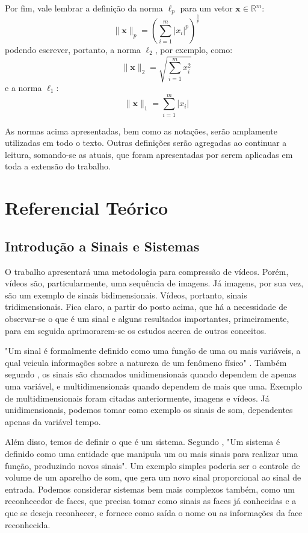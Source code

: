 \documentclass[cic,tc]{iiufrgs}
\renewcommand{\vec}[1]{\bm{#1}}
\begin{document}
Por fim, vale lembrar a definição da norma $\ell_p$ para um vetor $\vec{x} \in \mathbb{R}^m$:
\begin{equation*}
    \lVert \vec{x} \rVert_p = 
    \left( \sum_{i=1}^m {|x_i|^p} \right)^{\frac{1}{p}}
\end{equation*}
podendo escrever, portanto, a norma $\ell_2$, por exemplo, como:
\begin{equation*}
    \lVert \vec{x} \rVert_2 = 
    \sqrt{\sum_{i=1}^m {x_i^2}}
\end{equation*}
e a norma $\ell_1$:
\begin{equation*}
    \lVert \vec{x} \rVert_1 = 
    \sum_{i=1}^m {|x_i|}
\end{equation*}

As normas acima apresentadas, bem como as notações, serão amplamente utilizadas
em todo o texto. 
Outras definições serão agregadas ao continuar a leitura, somando-se as atuais, 
que foram apresentadas por serem aplicadas em toda a extensão do trabalho.

\chapter{Referencial Teórico}
\label{cap:ref}

\section{Introdução a Sinais e Sistemas}
O trabalho apresentará uma metodologia para compressão de vídeos.
Porém, vídeos são, particularmente, uma sequência de imagens.
Já imagens, por sua vez, são um exemplo de sinais bidimensionais.
Vídeos, portanto, sinais tridimensionais.
Fica claro, a partir do posto acima, que há a necessidade de observar-se 
o que é um sinal e alguns resultados importantes, primeiramente, para 
em seguida aprimorarem-se os estudos acerca de outros conceitos.

"Um sinal é formalmente definido como uma função de uma ou mais variáveis, 
a qual veicula informações sobre a natureza de um fenômeno físico" \cite{haykin2001sinais}.
Também segundo \citet{haykin2001sinais}, os sinais são chamados unidimensionais quando
dependem de apenas uma variável, e multidimensionais quando dependem de mais que uma.
Exemplo de multidimensionais foram citadas anteriormente, imagens e vídeos. 
Já unidimensionais, podemos tomar como exemplo os sinais de som, dependentes apenas da variável tempo.

Além disso, temos de definir o que é um sistema. 
Segundo \citet{haykin2001sinais}, "Um sistema é definido como uma entidade que manipula
um ou mais sinais para realizar uma função, produzindo novos sinais".
Um exemplo simples poderia ser o controle de volume de um aparelho de som,
que gera um novo sinal proporcional ao sinal de entrada.
Podemos considerar sistemas bem mais complexos também, como um reconhecedor 
de faces, que precisa tomar como sinais as faces já conhecidas e a que se 
deseja reconhecer, e fornece como saída o nome ou as informações da face reconhecida.
\end{document}
